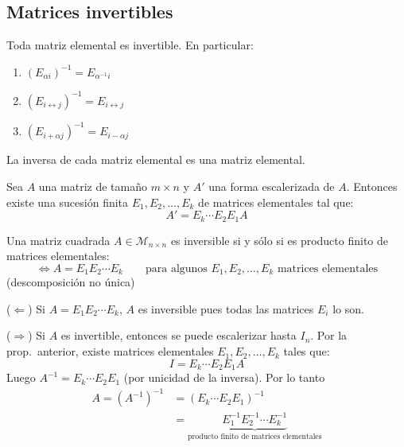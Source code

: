 \documentclass[11pt,a4paper]{article}
\newcommand{\M}{\mathcal{M}}
\begin{document}

\subsection{Matrices invertibles}

\begin{proposicion}
Toda matriz elemental es invertible. En particular:
\begin{enumerate}[label=\arabic*.]
  \item $(E_{\alpha i})^{-1}=E_{\alpha^{-1}i}$
  \item $(E_{i\leftrightarrow j})^{-1}=E_{i\leftrightarrow j}$
  \item $(E_{i+\alpha j})^{-1}=E_{i-\alpha j}$
\end{enumerate}
La inversa de cada matriz elemental es una matriz elemental.
\end{proposicion}

\begin{proposicion}
Sea $A$ una matriz de tamaño $m\times n$ y $A'$ una forma escalerizada de $A$. Entonces existe una sucesión finita $E_1,E_2,\dots,E_k$ de matrices elementales tal que:
\[
A'=E_k\cdots E_2E_1A
\]
\end{proposicion}

\begin{corolario}
Una matriz cuadrada $A\in\M_{n\times n}$ es inversible si y sólo si es producto finito de matrices elementales:
\[
\iff A=E_1E_2\cdots E_k\qquad\text{para algunos } E_1,E_2,\dots,E_k \text{ matrices elementales}
\]
(descomposición no única)
\end{corolario}

\begin{demo}
($\Leftarrow$) Si $A=E_1E_2\cdots E_k$, $A$ es inversible pues todas las matrices $E_i$ lo son.

($\Rightarrow$) Si $A$ es invertible, entonces se puede escalerizar hasta $I_n$. Por la prop.\ anterior, existe matrices elementales $E_1,E_2,\dots,E_k$ tales que:
\[
I=E_k\cdots E_2E_1A
\]
Luego $A^{-1}=E_k\cdots E_2E_1$ (por unicidad de la inversa). Por lo tanto
\begin{align*}
A=(A^{-1})^{-1}&=(E_k\cdots E_2E_1)^{-1}\\
&=\underbrace{E_1^{-1}E_2^{-1}\cdots E_k^{-1}}_{\text{producto finito de matrices elementales}}
\end{align*}
\end{demo}
\end{document}
